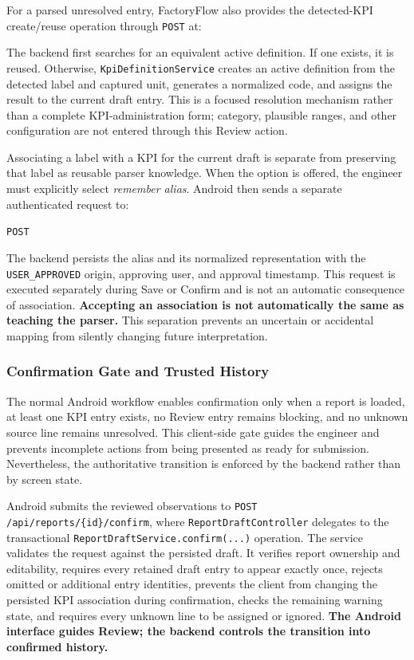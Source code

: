 For a parsed unresolved entry, FactoryFlow also provides the detected-KPI create/reuse operation through \texttt{POST} at:

\begin{center}
\end{center}

The backend first searches for an equivalent active definition. If one exists, it is reused. Otherwise, \texttt{KpiDefinitionService} creates an active definition from the detected label and captured unit, generates a normalized code, and assigns the result to the current draft entry. This is a focused resolution mechanism rather than a complete KPI-administration form; category, plausible ranges, and other configuration are not entered through this Review action.

Associating a label with a KPI for the current draft is separate from preserving that label as reusable parser knowledge. When the option is offered, the engineer must explicitly select \emph{remember alias}. Android then sends a separate authenticated request to:

\begin{center}
\texttt{POST }
\end{center}

The backend persists the alias and its normalized representation with the \texttt{USER\_APPROVED} origin, approving user, and approval timestamp. This request is executed separately during Save or Confirm and is not an automatic consequence of association. \textbf{Accepting an association is not automatically the same as teaching the parser.} This separation prevents an uncertain or accidental mapping from silently changing future interpretation.

\subsubsection{Confirmation Gate and Trusted History}

The normal Android workflow enables confirmation only when a report is loaded, at least one KPI entry exists, no Review entry remains blocking, and no unknown source line remains unresolved. This client-side gate guides the engineer and prevents incomplete actions from being presented as ready for submission. Nevertheless, the authoritative transition is enforced by the backend rather than by screen state.

Android submits the reviewed observations to \texttt{POST /api/reports/\{id\}/confirm}, where \texttt{ReportDraftController} delegates to the transactional \texttt{ReportDraftService.confirm(...)} operation. The service validates the request against the persisted draft. It verifies report ownership and editability, requires every retained draft entry to appear exactly once, rejects omitted or additional entry identities, prevents the client from changing the persisted KPI association during confirmation, checks the remaining warning state, and requires every unknown line to be assigned or ignored. \textbf{The Android interface guides Review; the backend controls the transition into confirmed history.}

